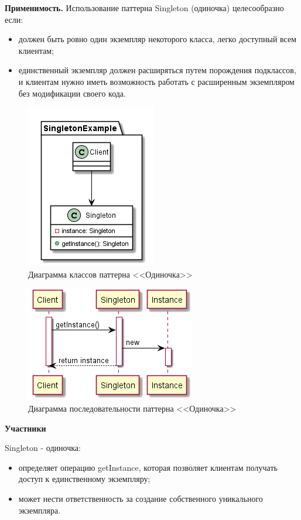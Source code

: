 \documentclass[PI,LAB]{HSEUniversity}
\begin{document}
\textbf{Применимость.}
Использование паттерна Singleton (одиночка) целесообразно если:
\begin{itemize}
  \item должен быть ровно один экземпляр некоторого класса, легко доступный всем клиентам;
  \item единственный экземпляр должен расширяться путем порождения подклассов, и клиентам нужно иметь возможность работать с расширенным экземпляром без модификации своего кода.
\end{itemize}
\clearpage

\begin{figure}[p]
  \centering
  \includegraphics[scale=1]{Singleton_CD.png}
  \caption{Диаграмма классов паттерна <<Одиночка>>}
\end{figure}

\begin{figure}[p]
  \centering
  \includegraphics[scale=1]{Singleton_SD.png}
  \caption{Диаграмма последовательности паттерна <<Одиночка>>}
\end{figure}
\clearpage

\textbf{Участники}

Singleton - одиночка:
\begin{itemize}
  \item определяет операцию getInstance, которая позволяет клиентам получать доступ к единственному экземпляру;
  \item может нести ответственность за создание собственного уникального экземпляра.
\end{itemize}
\end{document}
